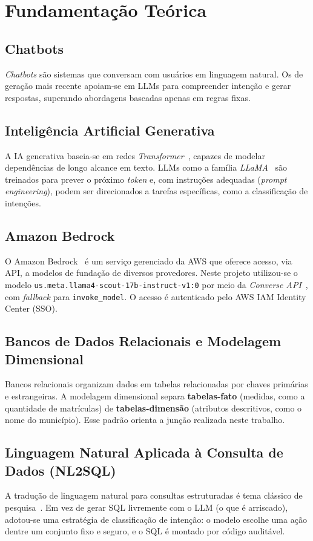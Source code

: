\documentclass[
    12pt,
    oneside,
    a4paper,
    chapter=TITLE,
    section=TITLE
]{abntex2}
\begin{document}
\chapter{Fundamentação Teórica}

\section{Chatbots}
\textit{Chatbots} são sistemas que conversam com usuários em linguagem natural. Os de geração mais
recente apoiam-se em LLMs para compreender intenção e gerar respostas, superando abordagens baseadas
apenas em regras fixas.

\section{Inteligência Artificial Generativa}
A IA generativa baseia-se em redes \textit{Transformer}~\cite{vaswani2017attention}, capazes de
modelar dependências de longo alcance em texto. LLMs como a família \textit{LLaMA}~\cite{llama} são
treinados para prever o próximo \textit{token} e, com instruções adequadas (\textit{prompt
engineering}), podem ser direcionados a tarefas específicas, como a classificação de intenções.

\section{Amazon Bedrock}
O Amazon Bedrock~\cite{aws_bedrock} é um serviço gerenciado da AWS que oferece acesso, via API, a
modelos de fundação de diversos provedores. Neste projeto utilizou-se o modelo
\texttt{us.meta.llama4-scout-17b-instruct-v1:0} por meio da \textit{Converse
API}~\cite{aws_bedrock_converse}, com \textit{fallback} para \texttt{invoke\_model}. O acesso é
autenticado pelo AWS IAM Identity Center (SSO).

\section{Bancos de Dados Relacionais e Modelagem Dimensional}
Bancos relacionais organizam dados em tabelas relacionadas por chaves primárias e estrangeiras. A
modelagem dimensional separa \textbf{tabelas-fato} (medidas, como a quantidade de matrículas) de
\textbf{tabelas-dimensão} (atributos descritivos, como o nome do município). Esse padrão orienta a
junção realizada neste trabalho.

\section{Linguagem Natural Aplicada à Consulta de Dados (NL2SQL)}
A tradução de linguagem natural para consultas estruturadas é tema clássico de
pesquisa~\cite{zhong2017seq2sql,yu2018spider}. Em vez de gerar SQL livremente com o LLM (o que é
arriscado), adotou-se uma estratégia de classificação de intenção: o modelo escolhe uma ação dentre
um conjunto fixo e seguro, e o SQL é montado por código auditável.
\end{document}
